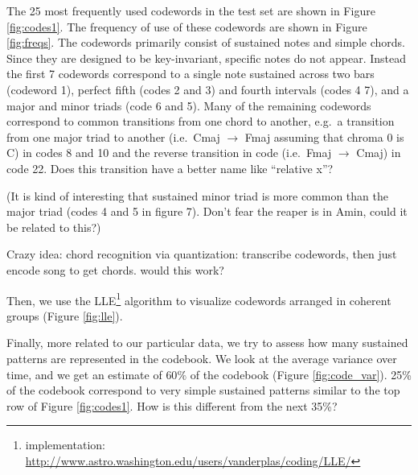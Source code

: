 \documentclass{article}
\newcommand{\ie}{i.e.~}
\newcommand{\eg}{e.g.~}
\begin{document}
The 25 most frequently used codewords in the test set are shown in
Figure \ref{fig:codes1}.  
The frequency of use of these codewords are shown in Figure \ref{fig:freqs}.
The codewords primarily consist of sustained
notes and simple chords.  Since they are designed to be key-invariant,
specific notes do not appear.  Instead the first 7 codewords
correspond to a single note sustained across two bars (codeword 1),
perfect fifth (codes 2 and 3) and fourth intervals (codes 4 7), and a
major and minor triads (code 6 and 5).  Many of the remaining
codewords correspond to common transitions from one chord to another,
\eg a transition from one major triad to another (\ie Cmaj
$\rightarrow$ Fmaj assuming that chroma 0 is C) in codes 8 and 10 and
the reverse transition in code (\ie Fmaj $\rightarrow$ Cmaj) in code
22.  Does this transition have a better name like ``relative x''?

(It is kind of interesting that sustained minor triad is more common
than the major triad (codes 4 and 5 in figure 7).  Don't fear the
reaper is in Amin, could it be related to this?)



Crazy idea: chord recognition via quantization: transcribe codewords,
then just encode song to get chords. would this work?


Then, we use the LLE\footnote{implementation:
  \url{http://www.astro.washington.edu/users/vanderplas/coding/LLE/}}
algorithm \cite{Roweis2000} to visualize codewords arranged in
coherent groups (Figure \ref{fig:lle}).

Finally, more related to our particular data, we try to assess how many
sustained patterns are represented in the codebook. We look at
the average variance over time, and we get an estimate of $60\%$ of the
codebook (Figure \ref{fig:code_var}).  25\% of the codebook correspond
to very simple sustained patterns similar to the top row of Figure
\ref{fig:codes1}.  How is this different from the next 35\%?
\end{document}
